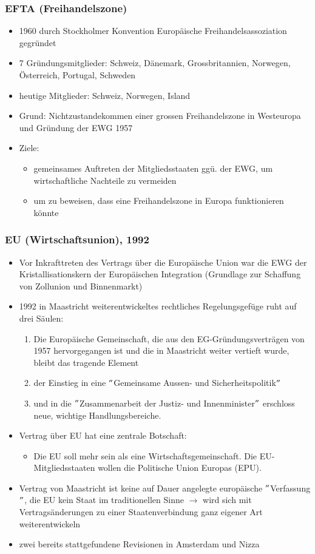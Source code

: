 \subsubsection{EFTA (Freihandelszone)}
\begin{itemize}
	\item 1960 durch Stockholmer Konvention Europäische Freihandelsassoziation gegründet
	\item 7 Gründungsmitglieder: Schweiz, Dänemark, Grossbritannien, Norwegen, Österreich, Portugal, Schweden
	\item heutige Mitglieder: Schweiz, Norwegen, Island
	\item Grund: Nichtzustandekommen einer grossen Freihandelszone in Westeuropa und Gründung der EWG 1957
	\item Ziele:
	\begin{itemize}
		\item gemeinsames Auftreten der Mitgliedsstaaten ggü. der EWG, um wirtschaftliche Nachteile zu vermeiden
		\item um zu beweisen, dass eine Freihandelszone in Europa funktionieren könnte
	\end{itemize} 
\end{itemize}

\subsubsection{EU (Wirtschaftsunion), 1992}
\begin{itemize}
	\item Vor Inkrafttreten des Vertrags über die Europäische Union war die EWG der Kristallisationskern der Europäischen Integration (Grundlage zur Schaffung von Zollunion und Binnenmarkt)
	\item 1992 in Maastricht weiterentwickeltes rechtliches Regelungsgefüge ruht auf drei Säulen:
	\begin{enumerate}
		\item Die Europäische Gemeinschaft, die aus den EG-Gründungsverträgen von 1957 hervorgegangen ist und die in Maastricht weiter vertieft wurde, bleibt das tragende Element
		\item der Einstieg in eine $"$Gemeinsame Aussen- und Sicherheitspolitik$"$
		\item und in die $"$Zusammenarbeit der Justiz- und Innenminister$"$ erschloss neue, wichtige Handlungsbereiche.
	\end{enumerate}
	\item Vertrag über EU hat eine zentrale Botschaft:
	\begin{itemize}
		\item Die EU soll mehr sein als eine Wirtschaftsgemeinschaft. Die EU-Mitgliedsstaaten wollen die Politische Union Europas (EPU).
	\end{itemize}
 	\item Vertrag von Maastricht ist keine auf Dauer angelegte europäische $"$Verfassung$"$, die EU kein Staat im traditionellen Sinne $\rightarrow$ wird sich mit Vertragsänderungen zu einer Staatenverbindung ganz eigener Art weiterentwickeln
 	\item zwei bereits stattgefundene Revisionen in Amsterdam und Nizza
\end{itemize}

